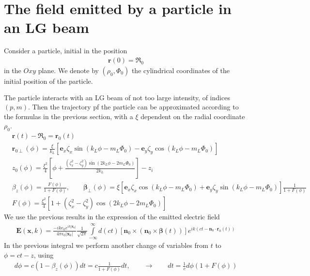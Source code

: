 \section{The field emitted by a particle in an LG beam}

Consider a particle, initial in the position
\begin{align}
    {\bm r}(0) = {\boldsymbol{\mathfrak R}}_0
\end{align}
in the $Oxy$ plane. We denote by $(\rho_0, \varPhi_0)$ the cylindrical coordinates of the initial position of the particle.

The particle interacts with an LG beam of not too large intensity, of indices $(p,m)$. Then the trajectory pf the particle can be approximated according to the formulas in the previous section, with a $\xi$ dependent on the radial coordinate $\rho_0$.
\begin{align}
     & {\bm r}(t) -{\boldsymbol{\mathfrak R}}_0={\bm r}_0(t)\nonumber                                                                                                                                           \\
     & {\bm r}_{0\perp}(\phi)=\frac{\xi}{k_L}\left[{\bm e}_x\zeta_x\sin(k_L\phi-m_L\varPhi_0)-{\bm e}_y\zeta_y\cos(k_L\phi-m_L\varPhi_0)\right]                                                                 \\
     & z_0(\phi)=\frac{\xi^2}4\left[\phi+\frac{(\zeta_x^2-\zeta_y^2)\sin(2k_L\phi-2m_L\varPhi_0)}{2k_L}\right] -z_i                                                                                             \\
     & \beta_z(\phi) =\frac{F(\phi)}{1+F(\phi)},\qquad  {\boldsymbol{\beta}}_\perp(\phi)=\xi\left[{\bm e}_x\zeta_x\cos(k_L\phi-m_L\varPhi_0)+{\bm e}_y\zeta_y\sin(k_L\phi-m_L\varPhi_0)\right]\frac1{1+F(\phi)} \\
     & F(\phi) = \frac{\xi^2}4\left[1+(\zeta_x^2-\zeta_y^2)\cos(2k_L\phi-2m_L\varPhi_0)\right]
\end{align}
We use the previous results in the expression of the emitted electric field
\begin{align}
    {\bm E}({\bm x},k) =\frac{-i k e_0 e^{ik |{\bm x}_0|}}{4\pi\epsilon_0|{\bm x}_0|}\frac1{\sqrt{2\pi}}\int\limits_{-\infty}^{\infty}d(ct)\left[{{\bm n}_0\times({\bm n}_0\times{\boldsymbol\beta}(t))}\right]e^{ik(ct-{\bm n}_0\cdot{\bm r}_0(t))}
\end{align}
In the previous integral we perform another change of variables from $t$ to $\phi=ct-z$, using
\begin{align}
    d\phi = c (1-\beta_z(\phi)) dt = c\frac1{1+F(\phi)} dt,\qquad \rightarrow \qquad dt=\frac1c d\phi(1+F(\phi))
\end{align}
